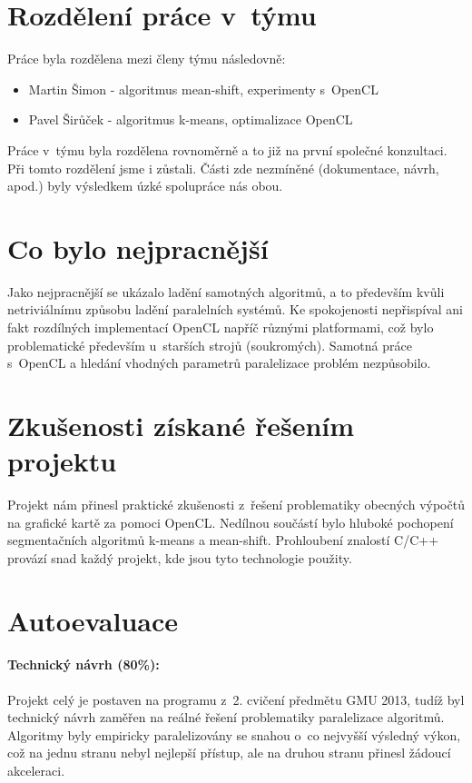 \documentclass[11pt,a4paper]{article}
\begin{document}
\section{Rozdělení práce v~týmu}
Práce byla rozdělena mezi členy týmu následovně:
\begin{itemize}
\item Martin Šimon - algoritmus mean-shift, experimenty s~OpenCL
\item Pavel Širůček - algoritmus k-means, optimalizace OpenCL
\end{itemize}

Práce v~týmu byla rozdělena rovnoměrně a to již na první společné konzultaci. Při tomto rozdělení jsme i zůstali. Části zde nezmíněné (dokumentace, návrh, apod.) byly výsledkem úzké spolupráce nás obou.

\section{Co bylo nejpracnější}
Jako nejpracnější se ukázalo ladění samotných algoritmů, a to především kvůli netriviálnímu způsobu ladění paralelních systémů. Ke spokojenosti nepřispíval ani fakt rozdílných implementací OpenCL napříč různými platformami, což bylo problematické především u~starších strojů (soukromých). Samotná práce s~OpenCL a hledání vhodných parametrů paralelizace problém nezpůsobilo.

\section{Zkušenosti získané řešením projektu}
Projekt nám přinesl praktické zkušenosti z~řešení problematiky obecných výpočtů na grafické kartě za pomoci OpenCL. Nedílnou součástí bylo hluboké pochopení segmentačních algoritmů k-means a mean-shift. Prohloubení znalostí C/C++ provází snad každý projekt, kde jsou tyto technologie použity.

\section{Autoevaluace}
\paragraph{Technický návrh (80\%):}
Projekt celý je postaven na programu z~2. cvičení předmětu GMU 2013, tudíž byl technický návrh zaměřen na reálné řešení problematiky paralelizace algoritmů. Algoritmy byly empiricky paralelizovány se snahou o~co nejvyšší výsledný výkon, což na jednu stranu nebyl nejlepší přístup, ale na druhou stranu přinesl žádoucí akceleraci.
\end{document}
